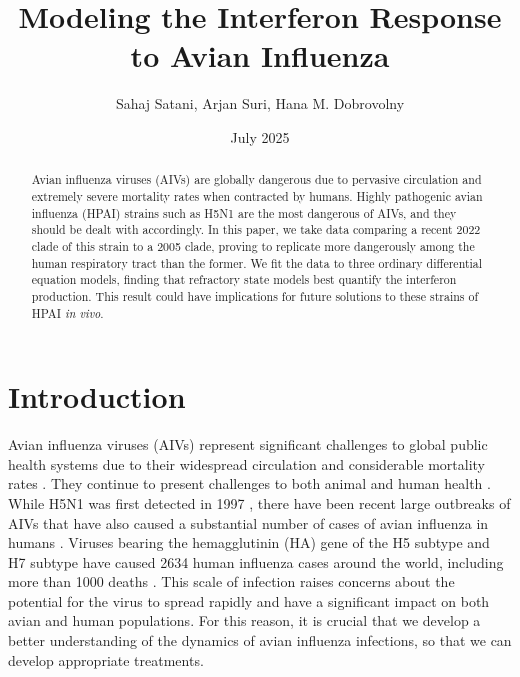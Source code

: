 \documentclass[12pt]{article}
\title{Modeling the Interferon Response to Avian Influenza}
\author{Sahaj Satani, Arjan Suri, Hana M. Dobrovolny}
\date{July 2025}
\begin{document}
\maketitle
\begin{abstract}
    \noindent Avian influenza viruses (AIVs) are globally dangerous due to pervasive circulation and extremely severe mortality rates when contracted by humans. Highly pathogenic avian influenza (HPAI) strains such as H5N1 are the most dangerous of AIVs, and they should be dealt with accordingly. In this paper, we take data comparing a recent 2022 clade of this strain to a 2005 clade, proving to replicate more dangerously among the human respiratory tract than the former. We fit the data to three ordinary differential equation models, finding that refractory state models best quantify the interferon production. This result could have implications for future solutions to these strains of HPAI \textit{in vivo}.
\end{abstract}

\section{Introduction}

Avian influenza viruses (AIVs) represent significant challenges to global public health systems due to their widespread circulation and considerable mortality rates \cite{charostad23,kiley25,imperia23}. They continue to present challenges to both animal \cite{bonilla24} and human health \cite{dabrera24,li19avian}. While H5N1 was first detected in 1997 \cite{yuen98}, there have been recent large outbreaks of AIVs \cite{tan25} that have also caused a substantial number of cases of avian influenza in humans \cite{ly24}. Viruses bearing the hemagglutinin (HA) gene of the H5 subtype and H7 subtype have caused 2634 human influenza cases around the world, including more than 1000 deaths \cite{shi22}. This scale of infection raises concerns about the potential for the virus to spread rapidly and have a significant impact on both avian and human populations. For this reason, it is crucial that we develop a better understanding of the dynamics of avian influenza infections, so that we can develop appropriate treatments. %
\end{document}
